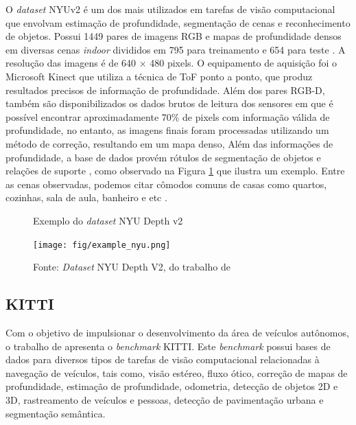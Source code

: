 O \textit{dataset} NYUv2 é um dos mais utilizados em tarefas de visão computacional que envolvam estimação de profundidade, segmentação de cenas e reconhecimento de objetos. Possui 1449 pares de imagens RGB e mapas de profundidade densos em diversas cenas \textit{indoor} divididos em 795 para treinamento e 654 para teste \cite{silberman2012indoor}. A resolução das imagens é de 640 $\times$ 480 pixels. O equipamento de aquisição foi o Microsoft Kinect que utiliza a técnica de ToF ponto a ponto, que produz resultados precisos de informação de profundidade. Além dos pares RGB-D, também são disponibilizados os dados brutos de leitura dos sensores em que é possível encontrar aproximadamente 70\% de pixels com informação válida de profundidade, no entanto, as imagens finais foram processadas utilizando um método de correção, resultando em um mapa denso,  Além das informações de profundidade, a base de dados provém rótulos de segmentação de objetos e relações de suporte \cite{lahiri2024deep}, como observado na Figura \ref{exnyuv2} que ilustra um exemplo. Entre as cenas observadas, podemos citar cômodos comuns de casas como quartos, cozinhas, sala de aula, banheiro e etc \cite{silberman2012indoor}.

\begin{figure}[h!]
    \centering
    \caption{Exemplo do \textit{dataset} NYU Depth v2}
    \texttt{[image: fig/example\_nyu.png]}
    \caption*{Fonte: \textit{Dataset} NYU Depth V2, do trabalho de }
    \label{exnyuv2}
\end{figure}

\newpage

\subsection{KITTI}

Com o objetivo de impulsionar o desenvolvimento da área de veículos autônomos, o trabalho de  apresenta o \textit{benchmark} KITTI. Este \textit{benchmark} possui bases de dados para diversos tipos de tarefas de visão computacional relacionadas à navegação de veículos, tais como, visão estéreo, fluxo ótico, correção de mapas de profundidade, estimação de profundidade, odometria, detecção de objetos 2D e 3D, rastreamento de veículos e pessoas, detecção de pavimentação urbana e segmentação semântica. 



